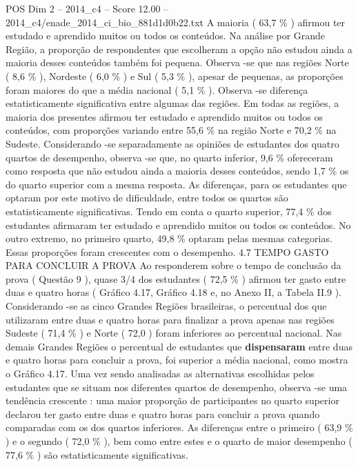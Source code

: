 \begin{textsample}{POS Dim 2 – 2014\_c4 – Score 12.00 – 2014\_c4/enade\_2014\_ci\_bio\_881d1d0b22.txt}
A maioria ( 63,7 \% ) afirmou ter estudado e aprendido muitos ou todos os conteúdos.
Na análise por Grande Região, a proporção de respondentes que escolheram a opção não estudou ainda a maioria desses conteúdos também foi pequena.
Observa -se que nas regiões Norte ( 8,6 \% ), Nordeste ( 6,0 \% ) e Sul ( 5,3 \% ), apesar de pequenas, as proporções foram maiores do que a média nacional ( 5,1 \% ).
Observa -se diferença estatisticamente significativa entre algumas das regiões.
Em todas as regiões, a maioria dos presentes afirmou ter estudado e aprendido muitos ou todos os conteúdos, com proporções variando entre 55,6 \% na região Norte e 70,2 \% na Sudeste.
Considerando -se separadamente as opiniões de estudantes dos quatro quartos de desempenho, observa -se que, no quarto inferior, 9,6 \% ofereceram como resposta que não estudou ainda a maioria desses conteúdos, sendo 1,7 \% os do quarto superior com a mesma resposta.
As diferenças, para os estudantes que optaram por este motivo de dificuldade, entre todos os quartos são estatisticamente significativas.
Tendo em conta o quarto superior, 77,4 \% dos estudantes afirmaram ter estudado e aprendido muitos ou todos os conteúdos.
No outro extremo, no primeiro quarto, 49,8 \% optaram pelas mesmas categorias.
Essas proporções foram crescentes com o desempenho. 4.7 TEMPO GASTO PARA CONCLUIR A PROVA Ao responderem sobre o tempo de conclusão da prova ( Questão 9 ), quase 3/4 dos estudantes ( 72,5 \% ) afirmou ter gasto entre duas e quatro horas ( Gráfico 4.17, Gráfico 4.18 e, no Anexo II, a Tabela II.9 ).
Considerando -se as cinco Grandes Regiões brasileiras, o percentual dos que utilizaram entre duas e quatro horas para finalizar a prova apenas nas regiões Sudeste ( 71,4 \% ) e Norte ( 72,0 ) foram inferiores ao percentual nacional.
Nas demais Grandes Regiões o percentual de estudantes que \textbf{dispensaram} entre duas e quatro horas para concluir a prova, foi superior a média nacional, como mostra o Gráfico 4.17.
Uma vez sendo analisadas as alternativas escolhidas pelos estudantes que se situam nos diferentes quartos de desempenho, observa -se uma tendência crescente : uma maior proporção de participantes no quarto superior declarou ter gasto entre duas e quatro horas para concluir a prova quando comparadas com os dos quartos inferiores.
As diferenças entre o primeiro ( 63,9 \% ) e o segundo ( 72,0 \% ), bem como entre estes e o quarto de maior desempenho ( 77,6 \% ) são estatisticamente significativas.

\end{textsample}
